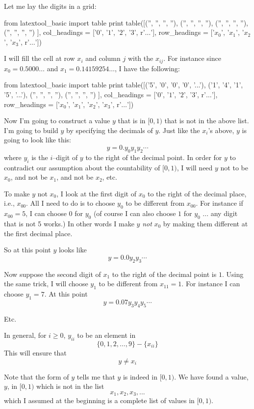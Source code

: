 Let me lay the digits in a grid:
\begin{python}
from latextool_basic import table
print table([('', '', '', ''),
('', '', '', ''),
('', '', '', ''),
('', '', '', '')
],
col_headings = ['$0$', '$1$', '$2$', '$3$', r'$\ldots$'],
row_headings = ['$x_0$', '$x_1$', '$x_2$', '$x_3$', r'$\ldots$'])
\end{python}
I will fill the cell at row $x_i$ and column $j$ with the $x_{ij}$.
For instance since $x_0 = 0.5000\ldots$ and $x_1 = 0.14159254\ldots$,
I have the following:
\begin{python}
from latextool_basic import table
print table([('5', '0', '0', '0', '...'),
('1', '4', '1', '5', '...'),
('', '', '', ''),
('', '', '', '')
],
col_headings = ['$0$', '$1$', '$2$', '$3$', r'$\ldots$'],
row_headings = ['$x_0$', '$x_1$', '$x_2$', '$x_3$', r'$\ldots$'])
\end{python}

Now I'm going to construct a value $y$ that is in $[0,1)$ that is
not in the above list.
I'm going to build $y$ by specifying the decimals of $y$.
Just like the $x_i$'s above, $y$ is going to look like this:
\[
y = 0.y_0 y_1 y_2 \cdots
\]
where $y_i$ is the $i$--digit of $y$ to the right of the decimal point.
In order for $y$ to contradict our assumption about 
the countability of $[0,1)$,
I will need $y$ not to be $x_0$, and not be $x_1$, and not be $x_2$, etc.

To make $y$ not $x_0$, I look at the first digit of $x_0$ to the right
of the decimal place, i.e., $x_{00}$.
All I need to do is to choose $y_0$ to be different from $x_{00}$.
For instance if $x_{00} = 5$, 
I can choose $0$ for $y_0$ (of course I can also choose $1$
for $y_0$ ... any digit that is not 5 works.)
In other words I make $y$ \textit{not} $x_0$ by making them different
at the first decimal place.

So at this point $y$ looks like
\[
y = 0.0y_2 y_3 \cdots
\]

Now suppose the second digit of $x_1$ to the right of the decimal point
is $1$.
Using the same trick, I will choose $y_1$ to be different from $x_{11} = 1$.
For instance I can choose $y_1 = 7$.
At this point
\[
y = 0.07 y_3 y_4 y_5 \cdots
\]

Etc.

In general, for $i \geq 0$, $y_{ii}$ to be an element in
\[
\{0, 1, 2, \ldots, 9\} - \{x_{ii}\}
\]
This will ensure that
\[
y \neq x_i
\]

Note that the form of $y$ tells me that $y$ is indeed in $[0,1)$.
We have found a value, $y$, in $[0,1)$ which is not in the list
\[
x_1, x_2, x_3, ...
\] 
which I assumed at the beginning is a complete list of values in $[0,1)$.

